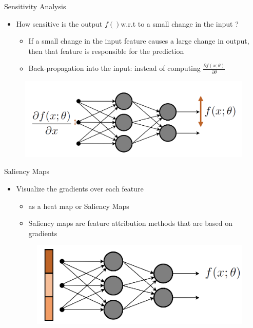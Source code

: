 \documentclass[11pt,compress,t,notes=noshow, aspectratio=169, xcolor=table]{beamer}
\begin{document}
\begin{frame}{Sensitivity Analysis}
    \begin{itemize}
        \item How sensitive is the output $f() $w.r.t to a small change in the input ?
        \begin{itemize}
            \item If a small change in the input feature causes a large change in output, then that
feature is responsible for the prediction
\item Back-propagation into the input: instead of computing \quad $\frac{\partial f(x;\theta)}{\partial\theta}$
        \end{itemize}
    \end{itemize}
\begin{figure}
    \centering
    \includegraphics[scale=.45]{bild14}
\end{figure}    
\end{frame}

\begin{frame}{Saliency Maps}
\begin{itemize}
    \item Visualize the gradients over each feature
    \begin{itemize}
        \item as a heat map or Saliency Maps %
        \item Saliency maps are feature attribution methods that are based on gradients
    \end{itemize}
    \bigskip
    \begin{figure}
        \includegraphics[scale=.5]{bild15}
    \end{figure}
\end{itemize}

\end{frame}
\end{document}
